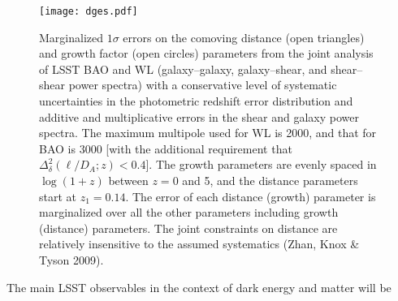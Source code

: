 \begin{figure}
\texttt{[image: dges.pdf]}
\caption{Marginalized $1\sigma$ errors on the comoving distance 
(open triangles) and growth factor (open circles) parameters from 
the joint analysis of LSST BAO and WL (galaxy--galaxy, galaxy--shear,
and shear--shear power spectra) with a 
conservative level of systematic uncertainties in the photometric redshift error 
distribution and additive and multiplicative errors in the shear and 
galaxy power spectra. The maximum multipole used for WL is 
2000, and that for BAO is 3000 [with the additional requirement that 
$\Delta_\delta^2(\ell/D_{A};z) < 0.4$].
The growth parameters
are evenly spaced in 
$\log(1+z)$ between $z = 0$ and 5, and the distance parameters
start at $z_1 = 0.14$.
The error of each distance (growth) parameter is marginalized 
over all the other parameters including growth (distance) parameters. The joint constraints on 
distance are relatively insensitive to the assumed systematics
(Zhan, Knox \& Tyson 2009).} 
\label{Fig:bao2}
\end{figure}


The main LSST observables in the context of dark energy and matter will be

